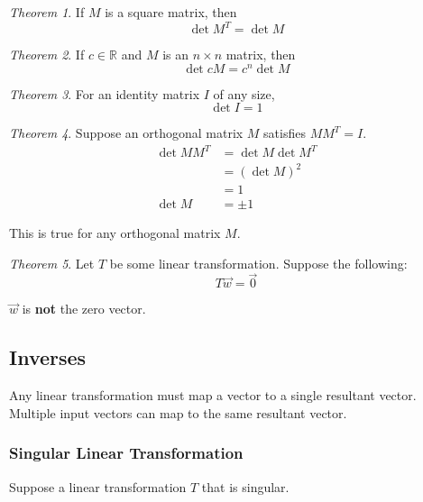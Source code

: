 \documentclass[a4paper]{article}
\theoremstyle{remark}
\theoremstyle{theorem}
\newtheorem{theorem}{Theorem}
\begin{document}
\begin{theorem}
	If $M$ is a square matrix, then
	\begin{equation}
		\det{M^T} = \det{M}
	\end{equation}
\end{theorem}

\begin{theorem}
	If $c\in\mathbb{R}$ and $M$ is an $n\times n$ matrix, then
	\begin{equation}
		\det{cM} = c^n\det{M}
	\end{equation}
\end{theorem}

\begin{theorem}
	For an identity matrix $I$ of any size,
	\begin{equation}
		\det{I} = 1
	\end{equation}
\end{theorem}

\begin{theorem}
	Suppose an orthogonal matrix $M$ satisfies $MM^T = I$.
	\begin{align}
		\det{MM^T} 	& = \det{M}\det{M^T} \\
					& = (\det{M})^2 \\
					& = 1 \\
		\det{M} 	& = \pm 1
	\end{align}
	
	This is true for any orthogonal matrix $M$.
\end{theorem}

\begin{theorem}
	Let $T$ be some linear transformation. Suppose the following:
	\begin{equation}
		T\vec{w} = \vec{0}
	\end{equation}

	$\vec{w}$ is \textbf{not} the zero vector.
\end{theorem}

\subsection{Inverses}
Any linear transformation must map a vector to a single resultant vector.
Multiple input vectors can map to the same resultant vector.

\subsubsection{Singular Linear Transformation}
Suppose a linear transformation $T$ that is singular.
\end{document}
